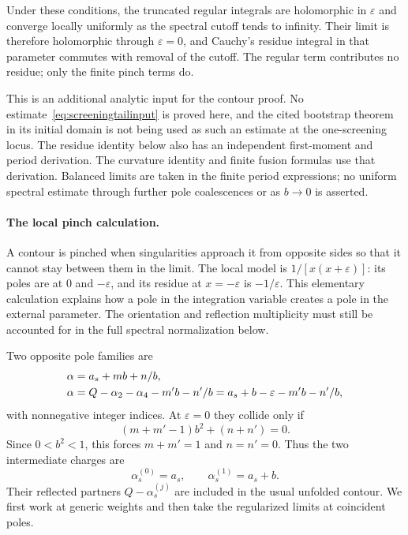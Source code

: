 Under these conditions, the truncated regular integrals are
holomorphic in $\varepsilon$ and converge locally uniformly as the
spectral cutoff tends to infinity. Their limit is therefore
holomorphic through $\varepsilon=0$, and Cauchy's residue integral
in that parameter commutes with removal of the cutoff. The regular
term contributes no residue; only the finite pinch terms do.

This is an additional analytic input for the contour proof. No
estimate~\eqref{eq:screeningtailinput} is proved here, and the cited
bootstrap theorem in its initial domain is not being used as such
an estimate at the one-screening locus. The residue identity below
also has an independent first-moment and period derivation. The
curvature identity and finite fusion formulas use that derivation.
Balanced limits are taken in the finite period expressions; no
uniform spectral estimate through further pole coalescences or as
$b\to0$ is asserted.

\paragraph{The local pinch calculation.}
A contour is pinched when singularities approach it from opposite
sides so that it cannot stay between them in the limit. The local
model is $1/[x(x+\varepsilon)]$: its poles are at $0$ and
$-\varepsilon$, and its residue at $x=-\varepsilon$ is
$-1/\varepsilon$. This elementary calculation explains how a pole
in the integration variable creates a pole in the external parameter.
The orientation and reflection multiplicity must still be accounted
for in the full spectral normalization below.

Two opposite pole families are
\begin{align}
 \alpha&=a_s+mb+n/b,\notag\\
 \alpha&=Q-\alpha_2-\alpha_4-m'b-n'/b
        =a_s+b-\varepsilon-m'b-n'/b,
 \label{eq:screeningpolefamilies}
\end{align}
with nonnegative integer indices. At $\varepsilon=0$ they collide
only if
\[
 (m+m'-1)b^2+(n+n')=0.
\]
Since $0<b^2<1$, this forces $m+m'=1$ and $n=n'=0$.
Thus the two intermediate charges are
\begin{equation}
 \boxed{\quad \alpha_s^{(0)}=a_s,\qquad
                 \alpha_s^{(1)}=a_s+b.\quad}
 \label{eq:twoscreeningchannels}
\end{equation}
Their reflected partners $Q-\alpha_s^{(j)}$ are included in the
usual unfolded contour. We first work at generic weights and
then take the regularized limits at coincident poles.

